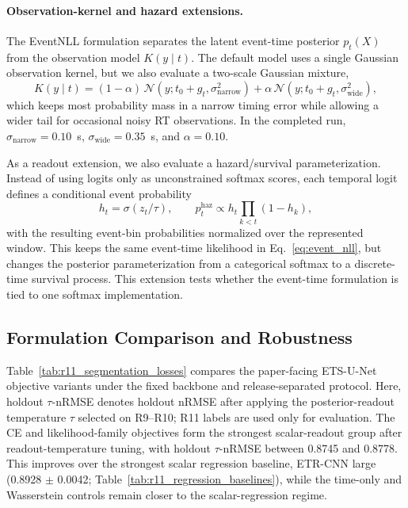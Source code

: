 \documentclass[12pt]{article}
\begin{document}
\paragraph{Observation-kernel and hazard extensions.}
The EventNLL formulation separates the latent event-time posterior $p_t(X)$ from the observation model $K(y\mid t)$. The default model uses a single Gaussian observation kernel, but we also evaluate a two-scale Gaussian mixture,
\begin{equation}
\label{eq:event_nll_mixture_kernel}
K(y\mid t)=(1-\alpha)\,\mathcal{N}(y;t_0+g_t,\sigma_{\mathrm{narrow}}^2)
+\alpha\,\mathcal{N}(y;t_0+g_t,\sigma_{\mathrm{wide}}^2),
\end{equation}
which keeps most probability mass in a narrow timing error while allowing a wider tail for occasional noisy RT observations. In the completed run, $\sigma_{\mathrm{narrow}}=0.10$~s, $\sigma_{\mathrm{wide}}=0.35$~s, and $\alpha=0.10$.

As a readout extension, we also evaluate a hazard/survival parameterization. Instead of using logits only as unconstrained softmax scores, each temporal logit defines a conditional event probability
\begin{equation}
\label{eq:hazard_readout}
h_t=\sigma(z_t/\tau),\qquad
p_t^{\mathrm{haz}} \propto h_t\prod_{k<t}(1-h_k),
\end{equation}
with the resulting event-bin probabilities normalized over the represented window. This keeps the same event-time likelihood in Eq.~\ref{eq:event_nll}, but changes the posterior parameterization from a categorical softmax to a discrete-time survival process. This extension tests whether the event-time formulation is tied to one softmax implementation.

\subsection{Formulation Comparison and Robustness}
Table~\ref{tab:r11_segmentation_losses} compares the paper-facing ETS-U-Net objective variants under the fixed backbone and release-separated protocol. Here, holdout \(\tau\)-nRMSE denotes holdout nRMSE after applying the posterior-readout temperature \(\tau\) selected on R9--R10; R11 labels are used only for evaluation. The CE and likelihood-family objectives form the strongest scalar-readout group after readout-temperature tuning, with holdout \(\tau\)-nRMSE between 0.8745 and 0.8778. This improves over the strongest scalar regression baseline, ETR-CNN large (0.8928 $\pm$ 0.0042; Table~\ref{tab:r11_regression_baselines}), while the time-only and Wasserstein controls remain closer to the scalar-regression regime.
\end{document}

